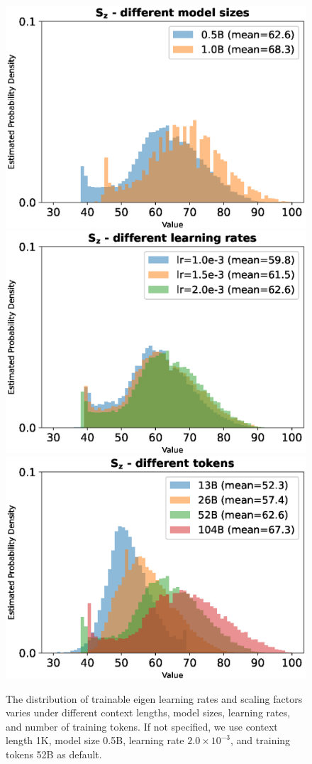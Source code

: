 \begin{figure}[h]
\begin{minipage}{\linewidth}
        \includegraphics[width=0.24\linewidth]{pdf/sz-size.eps}
        \includegraphics[width=0.24\linewidth]{pdf/sz-lr.eps}
        \includegraphics[width=0.24\linewidth]{pdf/sz-tokens.eps}
    \end{minipage}
    \caption{The distribution of trainable eigen learning rates and scaling factors varies under different context lengths, model sizes, learning rates, and number of training tokens. If not specified, we use context length 1K, model size 0.5B, learning rate $2.0 \times 10^{-3}$, and training tokens 52B as default.}
    \label{analysis-scaling}
\end{figure}